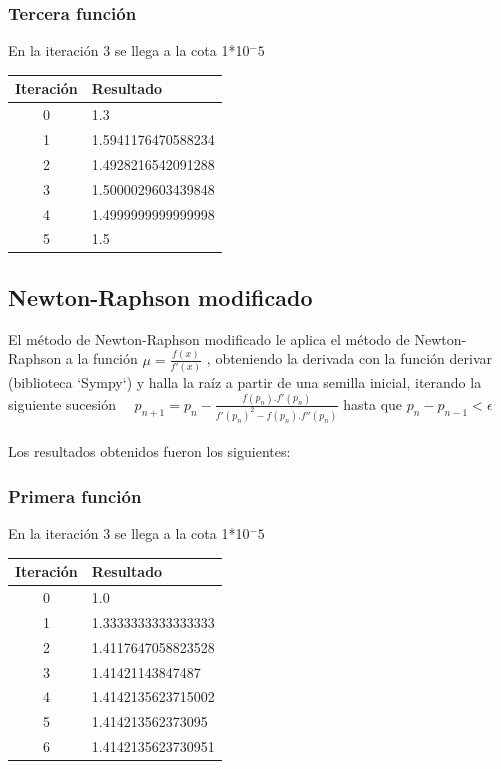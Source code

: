 \documentclass[titlepage,a4paper]{article}
\begin{document}
\subsubsection{Tercera función}\label{sec:NR3}
En la iteración 3 se llega a la cota 1*10$^-5$
\begin{center}
    \begin{tabular}{| c | l |}
    \hline
     Iteración & Resultado \\ \hline
       0     &  1.3 \\
    1     &  1.5941176470588234 \\
    2     &  1.4928216542091288 \\
    3     &  1.5000029603439848 \\
    4     &  1.4999999999999998 \\
    5     &  1.5 \\
    \hline
    \end{tabular}
\end{center}
\subsection{Newton-Raphson modificado}\label{sec:biseccion}

El método de Newton-Raphson modificado le aplica el método de Newton-Raphson a la función $\mu =\frac{f (x)}{f'(x)}$
, obteniendo la derivada con la función derivar (biblioteca `Sympy`) y halla la raíz a partir de una semilla inicial, iterando la siguiente sucesión
$
\quad p_{n+1}=p_n-\frac{f(p_n).f'(p_n)} {f'(p_n)^2-f(p_n).f''(p_n)}
 $ hasta que $
p_{n}-p_{n-1} < \mbox{$\epsilon$}
$
\\\\Los resultados obtenidos fueron los siguientes:

\subsubsection{Primera función}\label{sec:NRM1}
En la iteración 3 se llega a la cota 1*10$^-5$
\begin{center}
    \begin{tabular}{| c | l |}
    \hline
     Iteración & Resultado \\ \hline
       0     &  1.0 \\
    1     &  1.3333333333333333 \\
    2     &  1.4117647058823528 \\
    3     &  1.41421143847487 \\
    4     &  1.4142135623715002 \\
    5     &  1.414213562373095 \\
    6     &  1.4142135623730951 \\
    \hline
    \end{tabular}
\end{center}
\end{document}
